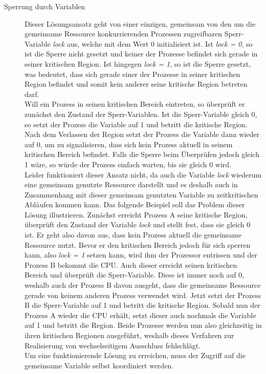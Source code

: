 \begin{description}
						\begin{description}
							\item[Sperrung durch Variablen]
							
								Dieser Lösungsansatz geht von einer einzigen, gemeinsam von den um die gemeinsame Ressource konkurrierenden Prozessen zugreifbaren Sperr-Variable \textit{lock} aus, welche mit dem Wert 0 initialisiert ist. Ist \textit{lock = 0}, so ist die Sperre nicht gesetzt und keiner der Prozesse befindet sich gerade in seiner kritischen Region. Ist hingegen \textit{lock = 1}, so ist die Sperre gesetzt, was bedeutet, dass sich gerade einer der Prozesse in seiner kritischen Region befindet und somit kein anderer seine kritische Region betreten darf.\\
								Will ein Prozess in seinen kritischen Bereich eintreten, so überprüft er zunächst den Zustand der Sperr-Variablen. Ist die Sperr-Variable gleich 0, so setzt der Prozess die Variable auf 1 und betritt die kritische Region. Nach dem Verlassen der Region setzt der Prozess die Variable dann wieder auf 0, um zu signalisieren, dass sich kein Prozess aktuell in seinem kritischen Bereich befindet. Falls die Sperre beim Überprüfen jedoch gleich 1 wäre, so würde der Prozess einfach warten, bis sie gleich 0 wird.\\
								Leider funktioniert dieser Ansatz nicht, da auch die Variable \textit{lock} wiederum eine gemeinsam genutzte Ressource darstellt und es deshalb auch in Zusammenhang mit dieser gemeinsam genutzten Variable zu zeitkritischen Abläufen kommen kann. Das folgende Beispiel soll das Problem dieser Lösung illustrieren. Zunächst erreicht Prozess A seine kritische Region, überprüft den Zustand der Variable \textit{lock} und stellt fest, dass sie gleich 0 ist. Er geht also davon aus, dass kein Prozess aktuell die gemeinsame Ressource nutzt. Bevor er den kritischen Bereich jedoch für sich sperren kann, also \textit{lock = 1} setzen kann, wird ihm der Prozessor entrissen und der Prozess B bekommt die CPU. Auch dieser erreicht seinen kritischen Bereich und überprüft die Sperr-Variable. Diese ist immer noch auf 0, weshalb auch der Prozess B davon ausgeht, dass die gemeinsame Ressource gerade von keinem anderen Prozess verwendet wird. Jetzt setzt der Prozess B die Sperr-Variable auf 1 und betritt die kritische Region. Sobald nun der Prozess A wieder die CPU erhält, setzt dieser auch nochmals die Variable auf 1 und betritt die Region. Beide Prozesse werden nun also gleichzeitig in ihren kritischen Regionen ausgeführt, weshalb dieses Verfahren zur Realisierung von wechselseitigem Ausschluss fehlschlägt.\\
								Um eine funktionierende Lösung zu erreichen, muss der Zugriff auf die gemeinsame Variable selbst koordiniert werden. \cite{ModerneBetriebssysteme}
								

\end{description}
\end{description}
